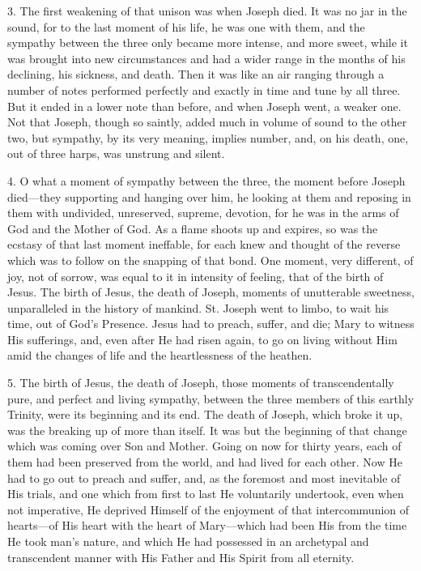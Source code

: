 3. The first weakening of that
unison was when Joseph died. It was no jar in the sound, for to the last
moment of his life, he was one with them, and the sympathy between the
three only became more intense, and more sweet, while it was brought
into new circumstances and had a wider range in the months of his
declining, his sickness, and death. Then it was like an air ranging
through a number of notes performed perfectly and exactly in time and
tune by all three. But it ended in a lower note than before, and when
Joseph went, a weaker one. Not that Joseph, though so saintly, added
much in volume of sound to the other two, but sympathy, by its very
meaning, implies number, and, on his death, one, out of three harps, was
unstrung and silent.

4. O what a moment of sympathy
between the three, the moment before Joseph died—they supporting and
hanging over him, he looking at them and reposing in them with
undivided, unreserved, supreme, devotion, for he was in the arms of God
and the Mother of God. As a flame shoots up and expires, so was the
ecstasy of that last moment ineffable, for each knew and thought of the
reverse which was to follow on the snapping of that bond. One
moment, very different, of joy, not of sorrow, was equal to it in
intensity of feeling, that of the birth of Jesus. The birth of Jesus,
the death of Joseph, moments of unutterable sweetness, unparalleled in
the history of mankind. St. Joseph went to limbo, to wait his time, out
of God's Presence. Jesus had to preach, suffer, and die; Mary to witness
His sufferings, and, even after He had risen again, to go on living
without Him amid the changes of life and the heartlessness of the
heathen.

5. The birth of Jesus, the death
of Joseph, those moments of transcendentally pure, and perfect and
living sympathy, between the three members of this earthly Trinity, were
its beginning and its end. The death of Joseph, which broke it up, was
the breaking up of more than itself. It was but the beginning of that
change which was coming over Son and Mother. Going on now for thirty
years, each of them had been preserved from the world, and had lived for
each other. Now He had to go out to preach and suffer, and, as the
foremost and most inevitable of His trials, and one which from first to
last He voluntarily undertook, even when not imperative, He deprived
Himself of the enjoyment of that intercommunion of hearts—of His heart
with the heart of Mary—which had been His from the time He took man's
nature, and which He had possessed in an archetypal and transcendent
manner with His Father and His Spirit from all eternity.

